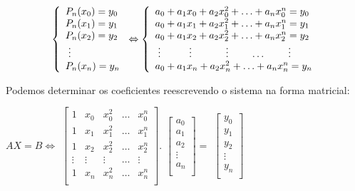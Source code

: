 \documentclass[12pt]{article}
\begin{document}
    \begin{equation}\label{sistema1}
    \left\{
        \begin{array}{l}
        P_n(x_0) = y_0\\
        P_n(x_1) = y_1\\
        P_n(x_2) = y_2\\
        \hspace{0.1cm} \vdots   \\
        P_n(x_n) = y_n
        \end{array}\right.\Leftrightarrow\left\{
        \begin{array}{l}
        a_0 + a_1 x_0 + a_2 x_0^2 + \ldots + a_n x_0^n  = y_0 \\
        a_0 + a_1 x_1 + a_2 x_1^2 + \ldots + a_n x_1^n = y_1 \\
        a_0 + a_1 x_2 + a_2 x_2^2 + \ldots + a_n x_2^n = y_2 \\
        \hspace{0.1cm} \vdots \hspace{1cm} \vdots \hspace{1.2cm} \vdots \hspace{0.78cm} \ldots \hspace{0.8cm} \vdots \\
        a_0 + a_1 x_n + a_2 x_n^2 + \ldots + a_n x_n^n = y_n
        \end{array}\right.
    \end{equation}

    Podemos determinar os coeficientes reescrevendo o sistema na forma matricial:

\begin{center}  
    $AX = B \Leftrightarrow$
    $\begin{bmatrix}
    1 & x_0 & x_0^2 & \ldots & x_0^n \\
    1 & x_1 & x_1^2 & \ldots & x_1^n \\
    1 & x_2 & x_2^2 & \ldots & x_2^n \\
    \vdots & \vdots & \vdots & \ldots & \vdots \\
    1 & x_n & x_n^2 & \ldots & x_n^n \\
    \end{bmatrix}.$  
    $\begin{bmatrix}
    a_0 \\
    a_1 \\
    a_2 \\
    \vdots \\
    a_n \\
    \end{bmatrix} =$
    $\begin{bmatrix}
    y_0 \\
    y_1 \\
    y_2 \\
    \vdots \\
    y_n \\
    \end{bmatrix}$
\end{center}
\end{document}
